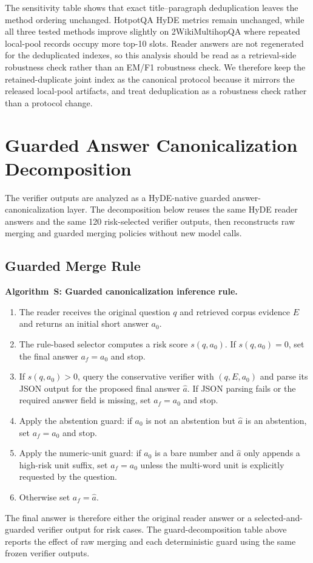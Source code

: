 \documentclass[10pt]{article}
\newcounter{algorithm}
\renewcommand{\thealgorithm}{S\arabic{algorithm}}
\begin{document}
The sensitivity table shows that exact title--paragraph deduplication leaves the method ordering unchanged. HotpotQA HyDE metrics remain unchanged, while all three tested methods improve slightly on 2WikiMultihopQA where repeated local-pool records occupy more top-10 slots. Reader answers are not regenerated for the deduplicated indexes, so this analysis should be read as a retrieval-side robustness check rather than an EM/F1 robustness check. We therefore keep the retained-duplicate joint index as the canonical protocol because it mirrors the released local-pool artifacts, and treat deduplication as a robustness check rather than a protocol change.

\clearpage
\section{Guarded Answer Canonicalization Decomposition}
\label{sec:supp_verifier_guard_decomposition}

The verifier outputs are analyzed as a HyDE-native guarded answer-canonicalization layer. The decomposition below reuses the same HyDE reader answers and the same 120 risk-selected verifier outputs, then reconstructs raw merging and guarded merging policies without new model calls.



\subsection{Guarded Merge Rule}
\label{sec:supp_guarded_merge_rule}

\noindent\textbf{Algorithm~\thealgorithm: Guarded canonicalization inference rule.}
\label{alg:guarded_canonicalization_rule}

\begin{enumerate}
    \item The reader receives the original question $q$ and retrieved corpus evidence $E$ and returns an initial short answer $a_0$.
    \item The rule-based selector computes a risk score $s(q,a_0)$. If $s(q,a_0)=0$, set the final answer $a_f=a_0$ and stop.
    \item If $s(q,a_0)>0$, query the conservative verifier with $(q,E,a_0)$ and parse its JSON output for the proposed final answer $\hat{a}$. If JSON parsing fails or the required answer field is missing, set $a_f=a_0$ and stop.
    \item Apply the abstention guard: if $a_0$ is not an abstention but $\hat{a}$ is an abstention, set $a_f=a_0$ and stop.
    \item Apply the numeric-unit guard: if $a_0$ is a bare number and $\hat{a}$ only appends a high-risk unit suffix, set $a_f=a_0$ unless the multi-word unit is explicitly requested by the question.
    \item Otherwise set $a_f=\hat{a}$.
\end{enumerate}
The final answer is therefore either the original reader answer or a selected-and-guarded verifier output for risk cases. The guard-decomposition table above reports the effect of raw merging and each deterministic guard using the same frozen verifier outputs.
\end{document}
